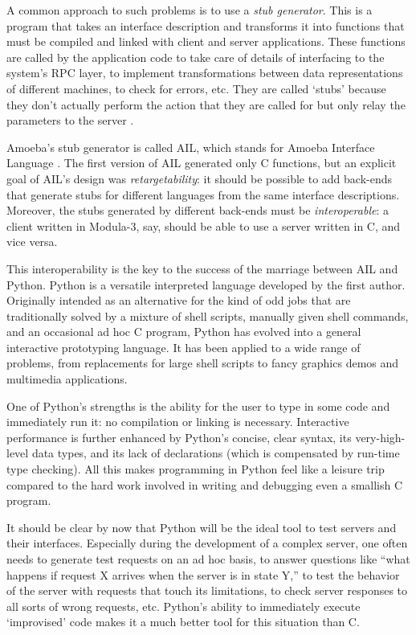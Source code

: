 A common approach to such problems is to use a {\em stub generator}.
This is a program that takes an interface description and transforms
it into functions that must be compiled and linked with client and
server applications.  These functions are called by the application
code to take care of details of interfacing to the system's RPC layer,
to implement transformations between data representations of different
machines, to check for errors, etc.  They are called `stubs' because
they don't actually perform the action that they are called for but
only relay the parameters to the server
\cite{RPC}.

Amoeba's stub generator is called AIL, which stands for Amoeba
Interface Language
\cite{AIL}.
The first version of AIL generated only C functions, but an explicit
goal of AIL's design was {\em retargetability}: it should be possible
to add back-ends that generate stubs for different languages from the
same interface descriptions.  Moreover, the stubs generated by
different back-ends must be {\em interoperable}: a client written in
Modula-3, say, should be able to use a server written in C, and vice
versa.

This interoperability is the key to the success of the marriage
between AIL and Python.  Python is a versatile interpreted language
developed by the first author.  Originally intended as an alternative
for the kind of odd jobs that are traditionally solved by a mixture of
shell scripts, manually given shell commands, and an occasional ad hoc
C program, Python has evolved into a general interactive prototyping
language.  It has been applied to a wide range of problems, from
replacements for large shell scripts to fancy graphics demos and
multimedia applications.

One of Python's strengths is the ability for the user to type in some
code and immediately run it: no compilation or linking is necessary.
Interactive performance is further enhanced by Python's concise, clear
syntax, its very-high-level data types, and its lack of declarations
(which is compensated by run-time type checking).  All this makes
programming in Python feel like a leisure trip compared to the hard
work involved in writing and debugging even a smallish C program.

It should be clear by now that Python will be the ideal tool to test
servers and their interfaces.  Especially during the development of a
complex server, one often needs to generate test requests on an ad hoc
basis, to answer questions like ``what happens if request X arrives
when the server is in state Y,'' to test the behavior of the server
with requests that touch its limitations, to check server responses to
all sorts of wrong requests, etc.  Python's ability to immediately
execute `improvised' code makes it a much better tool for this
situation than C.

